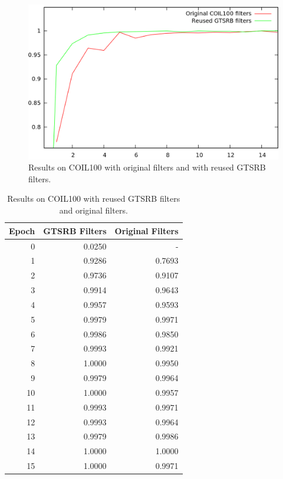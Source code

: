 \documentclass[11pt, a4paper]{article}
\begin{document}
\begin{figure}[h!]
	\centering
	\includegraphics[width=1\textwidth]{coil100_results.png}
	\caption{Results on COIL100 with original filters and with reused GTSRB filters.}
	\label{fig:coil100_results}
\end{figure}
\begin{table}[h!]
	\centering
	\begin{tabular}{|r|rr|}
		\hline
		Epoch & GTSRB Filters & Original Filters\\ \hline
		0 & 0.0250 & -\\
		1 & 0.9286 & 0.7693\\
		2 & 0.9736 & 0.9107\\
		3 & 0.9914 & 0.9643\\
		4 & 0.9957 & 0.9593\\
		5 & 0.9979 & 0.9971\\
		6 & 0.9986 & 0.9850\\
		7 & 0.9993 & 0.9921\\
		8 & 1.0000 & 0.9950\\
		9 & 0.9979 & 0.9964\\
		10 & 1.0000 & 0.9957\\
		11 & 0.9993 & 0.9971\\
		12 & 0.9993 & 0.9964\\
		13 & 0.9979 & 0.9986\\
		14 & 1.0000 & 1.0000\\
		15 & 1.0000 & 0.9971\\ \hline
	\end{tabular}

	\caption{Results on COIL100 with reused GTSRB filters and original filters.}
	\label{tab:coil-results}
\end{table}
\end{document}
